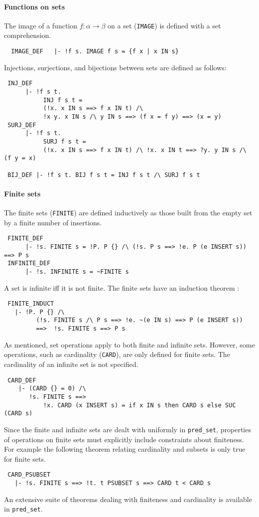 \paragraph{Functions on sets}
The image of a function $f :\alpha \to \beta$ on
a set ({\small\verb+IMAGE+}) is defined with a set comprehension.
{\small
\begin{verbatim}
  IMAGE_DEF   |- !f s. IMAGE f s = {f x | x IN s}
\end{verbatim}
}
%
Injections, surjections, and bijections between sets are defined
as follows:
%
{\small
\begin{verbatim}
 INJ_DEF
      |- !f s t.
           INJ f s t =
           (!x. x IN s ==> f x IN t) /\
           !x y. x IN s /\ y IN s ==> (f x = f y) ==> (x = y)
 SURJ_DEF
      |- !f s t.
           SURJ f s t =
           (!x. x IN s ==> f x IN t) /\ !x. x IN t ==> ?y. y IN s /\ (f y = x)

 BIJ_DEF |- !f s t. BIJ f s t = INJ f s t /\ SURJ f s t
\end{verbatim}
}
%
\paragraph{Finite sets}
The finite sets ({\small\verb+FINITE+}) are defined inductively as those
built from the empty set by a finite number of insertions.
%
{\small
\begin{verbatim}
 FINITE_DEF
      |- !s. FINITE s = !P. P {} /\ (!s. P s ==> !e. P (e INSERT s)) ==> P s
 INFINITE_DEF
      |- !s. INFINITE s = ~FINITE s
\end{verbatim}
}
%
A set is infinite iff it is not finite. The finite sets have an
induction theorem :
%
{\small
\begin{verbatim}
 FINITE_INDUCT
   |- !P. P {} /\
         (!s. FINITE s /\ P s ==> !e. ~(e IN s) ==> P (e INSERT s))
         ==>  !s. FINITE s ==> P s
\end{verbatim}
}
%
As mentioned, set operations apply to both finite and infinite
sets. However, some operations, such as cardinality
({\small\verb+CARD+}), are only defined for finite sets.  The
cardinality of an infinite set is not specified.
%
{\small
\begin{verbatim}
 CARD_DEF
    |- (CARD {} = 0) /\
       !s. FINITE s ==>
           !x. CARD (x INSERT s) = if x IN s then CARD s else SUC (CARD s)
\end{verbatim}
}
%
Since the finite and infinite sets are dealt with uniformly in
 {\small\verb+pred_set+}, properties of operations on finite sets must
explicitly include constraints about finiteness. For example the
following theorem relating cardinality and subsets is only true
for finite sets.
%
{\small
\begin{verbatim}
 CARD_PSUBSET
   |- !s. FINITE s ==> !t. t PSUBSET s ==> CARD t < CARD s
\end{verbatim}
}
%
An extensive suite of theorems dealing with finiteness and cardinality
is available in {\small\verb+pred_set+}.

